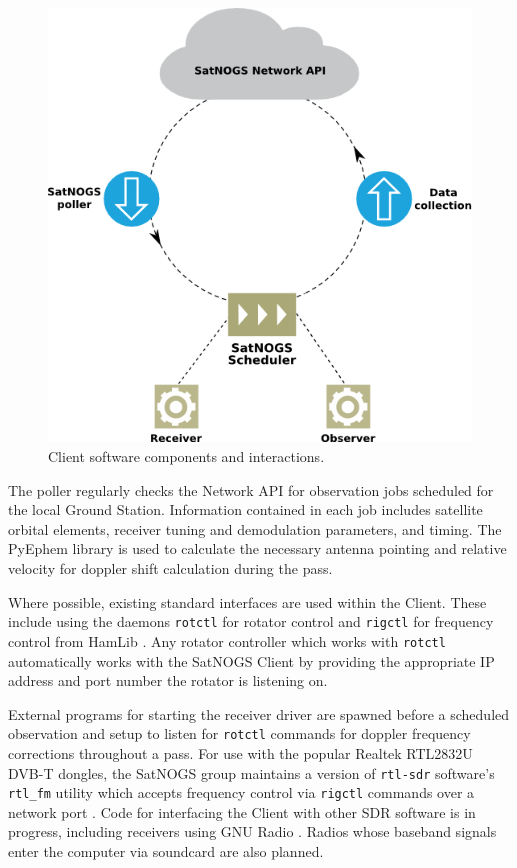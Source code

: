 \documentclass[conference]{IEEEtran}
\begin{document}
\begin{figure}[htbp]
\centering
\includegraphics[width=\columnwidth]{fig/client-flow}
\caption{Client software components and interactions.}
\label{f:client-flow}
\end{figure}

The poller regularly checks the Network API for observation jobs scheduled for the local Ground Station.
Information contained in each job includes satellite orbital elements, receiver tuning and demodulation parameters, and timing.
The PyEphem \cite{PyEphem} library is used to calculate the necessary antenna pointing and relative velocity for doppler shift calculation during the pass.

Where possible, existing standard interfaces are used within the Client.
These include using the daemons \verb|rotctl| for rotator control and \verb|rigctl| for frequency control from HamLib \cite{Hamlib}.
Any rotator controller which works with \verb|rotctl| automatically works with the SatNOGS Client by providing the appropriate IP address and port number the rotator is listening on.

External programs for starting the receiver driver are spawned before a scheduled observation and setup to listen for \verb|rotctl| commands for doppler frequency corrections throughout a pass.
For use with the popular Realtek RTL2832U DVB-T dongles, the SatNOGS group maintains a version of \verb|rtl-sdr| \cite{rtl-sdr} software's \verb|rtl_fm| utility which accepts frequency control via \verb|rigctl| commands over a network port \cite{SatNOGS-rtlsdr}.
Code for interfacing the Client with other SDR software is in progress, including receivers using GNU Radio \cite{GNURadio}.
Radios whose baseband signals enter the computer via soundcard are also planned.
\end{document}
